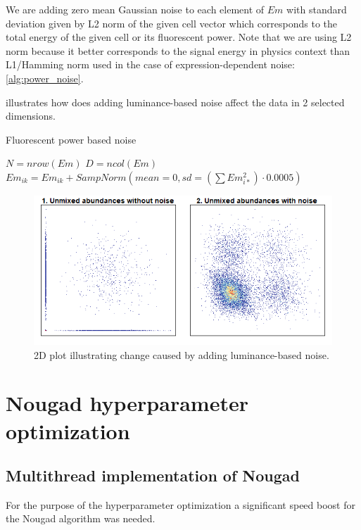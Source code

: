 We are adding zero mean Gaussian noise to each element of $Em$ with standard deviation given by L2 norm of the given cell vector which corresponds to the total energy of the given cell or its fluorescent power. Note that we are using L2 norm because it better corresponds to the signal energy in physics context than L1/Hamming norm used in the case of expression-dependent noise: \cref{alg:power_noise}.

 illustrates how does adding luminance-based noise affect the data in 2 selected dimensions.

  \begin{algorithm}
  \caption{Fluorescent power based noise}
  \label{alg:power_noise}
  \begin{algorithmic}
  \State $N = nrow(Em)$
  \State $D = ncol(Em)$
  \State $Em_{ik}=Em_{ik}+SampNorm(mean=0,sd=(\sum{Em_{i*}^2})\cdot 0.0005)$
  \EndFor 
  \EndFor 
  \end{algorithmic}
  \end{algorithm}
  

 
\begin{figure}
 \includegraphics[width=1\linewidth]{img/2D_gen2.png}
 \caption{2D plot illustrating change caused by adding luminance-based noise.}
 \label{fig:2D_gen}
\end{figure}

\section{Nougad hyperparameter optimization}
 
\subsection{Multithread implementation of Nougad}
For the purpose of the hyperparameter optimization a significant speed boost for the Nougad algorithm was needed.

